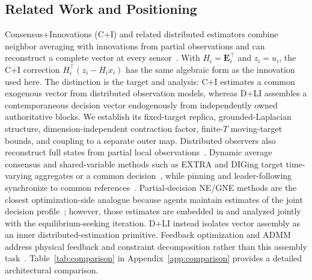\documentclass[letterpaper, 10 pt, conference]{ieeeconf} %
\begin{document}
\subsection{Related Work and Positioning}
Consensus+Innovations (C+I) and related distributed estimators combine neighbor averaging with innovations from partial observations and can reconstruct a complete vector at every sensor~\cite{kar_distributed_2012,kar_consensus_2013,xie_fully_2012,sahu_mathcal_2018}. With \(H_i=\mathbf E_i^\top\) and \(z_i=u_i\), the C+I correction \(H_i^\top(z_i-H_i x_i)\) has the same algebraic form as the innovation used here. The distinction is the target and analysis: C+I estimates a common exogenous vector from distributed observation models, whereas D+LI assembles a contemporaneous decision vector endogenously from independently owned authoritative blocks. We establish its fixed-target replica, grounded-Laplacian structure, dimension-independent contraction factor, finite-\(T\) moving-target bounds, and coupling to a separate outer map. Distributed observers also reconstruct full states from partial local observations~\cite{mitra_distributed_2018}. Dynamic average consensus and shared-variable methods such as EXTRA and DIGing target time-varying aggregates or a common decision~\cite{kia_tutorial_2019,shi_extra_2015,nedic_achieving_2017,qu_harnessing_2018}, while pinning and leader-following synchronize to common references~\cite{chen_reaching_2009}. Partial-decision NE/GNE methods are the closest optimization-side analogue because agents maintain estimates of the joint decision profile~\cite{pavel_distributed_2020,bianchi_fully_2021,bianchi_fast_2022}; however, those estimates are embedded in and analyzed jointly with the equilibrium-seeking iteration. D+LI instead isolates vector assembly as an inner distributed-estimation primitive. Feedback optimization and ADMM address physical feedback and constraint decomposition rather than this assembly task~\cite{erseghe_distributed_2014,dallanese_distributed_2013,picallo_closing_2020}. Table~\ref{tab:comparison} in Appendix~\ref{app:comparison} provides a detailed architectural comparison.
\end{document}
